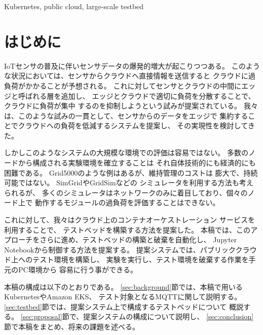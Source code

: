 \documentclass[submit,techrep]{ipsj}
\newcommand{\kbs}{Kubernetes}
\begin{document}
\begin{ekeyword}
  \kbs, public cloud, large-scale testbed
\end{ekeyword}

\maketitle

\section{はじめに}

IoTセンサの普及に伴いセンサデータの爆発的増大が起こりつつある。
このような状況においては、センサからクラウドへ直接情報を送信すると
クラウドに過負荷がかかることが予想される。
これに対してセンサとクラウドの中間にエッジと呼ばれる層を追加し、
エッジとクラウドで適切に負荷を分散することで、クラウドに負荷が集中
するのを抑制しようという試みが提案されている\cite{iot}\cite{Edge-computing}。
我々は、このような試みの一貫として、センサからのデータをエッジで
集約することでクラウドへの負荷を低減するシステムを提案し、
その実現性を検討してきた\cite{tou-os}。

しかしこのようなシステムの大規模な環境での評価は容易ではない。
多数のノードから構成される実験環境を確立することは
それ自体技術的にも経済的にも困難である。
Grid5000\cite{grid5000}のような例はあるが、維持管理のコストは
膨大で、持続可能ではない。
%
SimGrid\cite{simgrid}やGridSim\cite{GridSim}などの
シミュレータを利用する方法も考えられるが、
多くのシミュレータはネットワークのみに着目しており、個々のノード上で
動作するモジュールの過負荷を評価することはできない。

これに対して、我々はクラウド上のコンテナオーケストレーション
サービスを利用することで、
テストベッドを構築する方法を提案した\cite{tou-hpc}\cite{tou-imcom}。
本稿では、このアプローチをさらに進め、テストベッドの構築と破棄を自動化し、
Jupyter Notebook\cite{jupyternotebook}から制御する方法を提案する。
提案システムでは、パブリッククラウド上へのテスト環境を構築し、
実験を実行し、テスト環境を破棄する作業を手元のPC環境から
容易に行う事ができる。

本稿の構成は以下のとおりである。
\ref{sec:background}節では、本稿で用いる\kbs やAmazon EKS、
テスト対象となるMQTTに関して説明する。
\ref{sec:testbed}節では、提案システム上で構成するテストベッドについて
概説する。
\ref{sec:proposal}節で、提案システムの構成について説明し、
\ref{sec:conclusion}節で本稿をまとめ、将来の課題を述べる。
\end{document}
